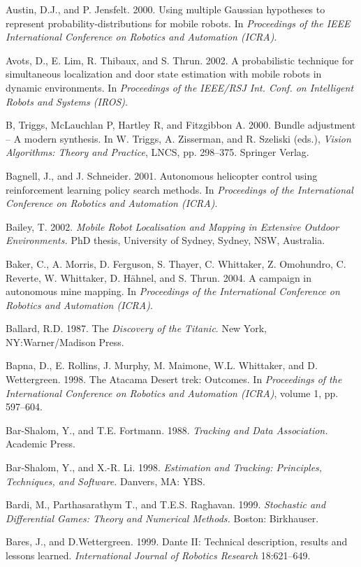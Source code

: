 \documentclass[10pt,a4paper]{article}
\begin{document}
Austin, D.J., and P. Jensfelt. 2000. Using multiple Gaussian hypotheses to represent
probability-distributions for mobile robots. In \textit{Proceedings of the IEEE International
Conference on Robotics and Automation (ICRA)}.

Avots, D., E. Lim, R. Thibaux, and S. Thrun. 2002. A probabilistic technique for simultaneous
localization and door state estimation with mobile robots in dynamic
environments. In \textit{Proceedings of the IEEE/RSJ Int. Conf. on Intelligent Robots and Systems
(IROS)}.

B, Triggs, McLauchlan P, Hartley R, and Fitzgibbon A. 2000. Bundle adjustment
– A modern synthesis. In W. Triggs, A. Zisserman, and R. Szeliski (eds.), \textit{Vision
Algorithms: Theory and Practice}, LNCS, pp. 298–375. Springer Verlag.

Bagnell, J., and J. Schneider. 2001. Autonomous helicopter control using reinforcement
learning policy search methods. In\textit{ Proceedings of the International Conference
on Robotics and Automation (ICRA)}.

Bailey, T. 2002. \textit{Mobile Robot Localisation and Mapping in Extensive Outdoor Environments.}
PhD thesis, University of Sydney, Sydney, NSW, Australia.

Baker, C., A. Morris, D. Ferguson, S. Thayer, C. Whittaker, Z. Omohundro, C. Reverte,
W. Whittaker, D. Hähnel, and S. Thrun. 2004. A campaign in autonomous mine
mapping. In \textit{Proceedings of the International Conference on Robotics and Automation
(ICRA)}.

Ballard, R.D. 1987. The \textit{Discovery of the Titanic}. New York, NY:Warner/Madison Press.

Bapna, D., E. Rollins, J. Murphy, M. Maimone, W.L. Whittaker, and D. Wettergreen.
1998. The Atacama Desert trek: Outcomes. In \textit{Proceedings of the International Conference
on Robotics and Automation (ICRA)}, volume 1, pp. 597–604.

Bar-Shalom, Y., and T.E. Fortmann. 1988. \textit{Tracking and Data Association.} Academic
Press.

Bar-Shalom, Y., and X.-R. Li. 1998. \textit{Estimation and Tracking: Principles, Techniques, and
Software.} Danvers, MA: YBS.

Bardi, M., Parthasarathym T., and T.E.S. Raghavan. 1999. \textit{Stochastic and Differential
Games: Theory and Numerical Methods.} Boston: Birkhauser.

Bares, J., and D.Wettergreen. 1999. Dante II: Technical description, results and lessons
learned. \textit{International Journal of Robotics Research} 18:621–649.
\end{document}
